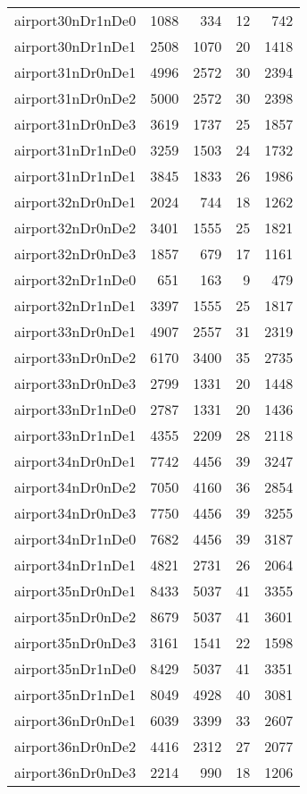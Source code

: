 \begin{longtable}{lrrrr}
airport30nDr1nDe0 & 1088 & 334 & 12 & 742 \\
airport30nDr1nDe1 & 2508 & 1070 & 20 & 1418 \\
airport31nDr0nDe1 & 4996 & 2572 & 30 & 2394 \\
airport31nDr0nDe2 & 5000 & 2572 & 30 & 2398 \\
airport31nDr0nDe3 & 3619 & 1737 & 25 & 1857 \\
airport31nDr1nDe0 & 3259 & 1503 & 24 & 1732 \\
airport31nDr1nDe1 & 3845 & 1833 & 26 & 1986 \\
airport32nDr0nDe1 & 2024 & 744 & 18 & 1262 \\
airport32nDr0nDe2 & 3401 & 1555 & 25 & 1821 \\
airport32nDr0nDe3 & 1857 & 679 & 17 & 1161 \\
airport32nDr1nDe0 & 651 & 163 & 9 & 479 \\
airport32nDr1nDe1 & 3397 & 1555 & 25 & 1817 \\
airport33nDr0nDe1 & 4907 & 2557 & 31 & 2319 \\
airport33nDr0nDe2 & 6170 & 3400 & 35 & 2735 \\
airport33nDr0nDe3 & 2799 & 1331 & 20 & 1448 \\
airport33nDr1nDe0 & 2787 & 1331 & 20 & 1436 \\
airport33nDr1nDe1 & 4355 & 2209 & 28 & 2118 \\
airport34nDr0nDe1 & 7742 & 4456 & 39 & 3247 \\
airport34nDr0nDe2 & 7050 & 4160 & 36 & 2854 \\
airport34nDr0nDe3 & 7750 & 4456 & 39 & 3255 \\
airport34nDr1nDe0 & 7682 & 4456 & 39 & 3187 \\
airport34nDr1nDe1 & 4821 & 2731 & 26 & 2064 \\
airport35nDr0nDe1 & 8433 & 5037 & 41 & 3355 \\
airport35nDr0nDe2 & 8679 & 5037 & 41 & 3601 \\
airport35nDr0nDe3 & 3161 & 1541 & 22 & 1598 \\
airport35nDr1nDe0 & 8429 & 5037 & 41 & 3351 \\
airport35nDr1nDe1 & 8049 & 4928 & 40 & 3081 \\
airport36nDr0nDe1 & 6039 & 3399 & 33 & 2607 \\
airport36nDr0nDe2 & 4416 & 2312 & 27 & 2077 \\
airport36nDr0nDe3 & 2214 & 990 & 18 & 1206 \\

\end{longtable}
